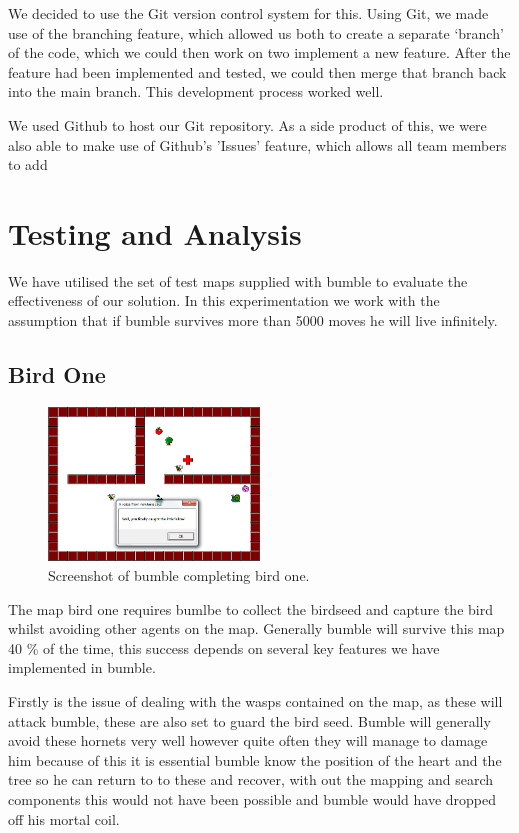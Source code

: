 \documentclass[a4paper,oneside]{report}
\begin{document}
We decided to use the Git version control system for this. Using Git, we made use of the branching feature, which allowed us both to create a separate `branch' of the code, which we could then work on two implement a new feature. After the feature had been implemented and tested, we could then merge that branch back into the main branch. This development process worked well.

We used Github to host our Git repository. As a side product of this, we were also able to make use of Github's 'Issues' feature, which allows all team members to add 
	
\section{Testing and Analysis}

We have utilised the set of test maps supplied with bumble to evaluate the effectiveness of our solution. In this experimentation we work with the assumption that if bumble survives more than 5000 moves he will live infinitely.
	
	\subsection{Bird One}

		\begin{figure}[h!]
		  \centering
			\includegraphics[width=0.5\textwidth]{bumbleBird1.png}
			\caption{Screenshot of bumble completing bird one.}
		\end{figure}


	The map bird one requires bumlbe to collect the birdseed and capture the bird whilst avoiding other agents on the map.  Generally bumble will survive this map 40 \% of the time, this success depends on several key features we have implemented in bumble. 
	
	Firstly is the issue of dealing with the wasps contained on the map, as these will attack bumble, these are also set to guard the bird seed. Bumble will generally avoid these hornets very well however quite often they will manage to damage him because of this it is essential bumble know the position of the heart and the tree so he can return to to these and recover, with out the mapping and search components this would not have been possible and bumble would have dropped off his mortal coil. 
	
\end{document}
